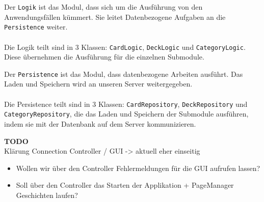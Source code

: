 \documentclass[fontsize=12pt,paper=A4,twoside]{scrartcl}
\begin{document}
    Der \texttt{Logik} ist das Modul, dass sich um die Ausführung von den Anwendungsfällen kümmert.
    Sie leitet Datenbezogene Aufgaben an die \texttt{Persistence} weiter.\\\\
    Die Logik teilt sind in 3 Klassen: \texttt{CardLogic}, \texttt{DeckLogic} und \texttt{CategoryLogic}. Diese übernehmen
    die Ausführung für die einzelnen Submodule.
  
    Der \texttt{Persistence} ist das Modul, dass datenbezogene Arbeiten ausführt. Das Laden und Speichern wird
    an unseren Server weitergegeben.\\\\
    Die Persistence teilt sind in 3 Klassen: \texttt{CardRepository}, \texttt{DeckRepository} und \texttt{CategoryRepository}, die das Laden und Speichern der
    Submodule ausführen, indem sie mit der Datenbank auf dem Server kommunizieren.


    \textbf{TODO}\\ 
    Klärung Connection Controller / GUI -> aktuell eher einseitig
    \begin{itemize}
    \item Wollen wir über den Controller Fehlermeldungen für die GUI 
    aufrufen lassen?
    \item Soll über den Controller das Starten der Applikation + PageManager Geschichten laufen? 
    \end{itemize}
\end{document}
